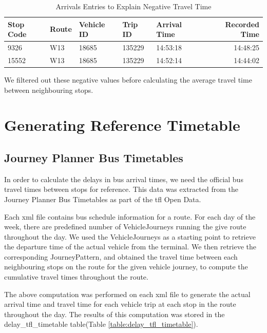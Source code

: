 \begin{table}
\centering
\begin{tabular}{@{}lllllr@{}} \toprule
Stop Code & Route & Vehicle ID & Trip ID & Arrival Time & Recorded Time\\ \midrule
9326 & W13 & 18685 & 135229 &  14:53:18 & 14:48:25 \\ [0.4cm]
15552 & W13 & 18685 & 135229 & 14:52:14 & 14:44:02 \\ \bottomrule
\end{tabular}
\caption{Arrivals Entries to Explain Negative Travel Time}
\label{table:negative_travel_time_explained}
\end{table}

\par We filtered out these negative values before calculating the average travel time between neighbouring stops.

\section{Generating Reference Timetable}
\subsection{Journey Planner Bus Timetables}
\label{sec: official_tfl_timetable}
\par In order to calculate the delays in bus arrival times, we need the official bus travel times between stops for reference. This data was extracted from the Journey Planner Bus Timetables\cite{open_data_feeds_description} as part of the \acrshort{tfl} Open Data.


\par Each xml file contains bus schedule information for a route. For each day of the week, there are predefined number of VehicleJourneys running the give route throughout the day. We used the VehicleJourneys as a starting point to retrieve the departure time of the actual vehicle from the terminal. We then retrieve the corresponding JourneyPattern, and obtained the travel time between each neighbouring stops on the route for the given vehicle journey, to compute the cumulative travel times throughout the route.

The above computation was performed on each xml file to generate the actual arrival time and travel time for each vehicle trip at each stop in the route throughout the day. The results of this computation was stored in the delay\_tfl\_timetable table(Table \ref{table:delay_tfl_timetable}).

